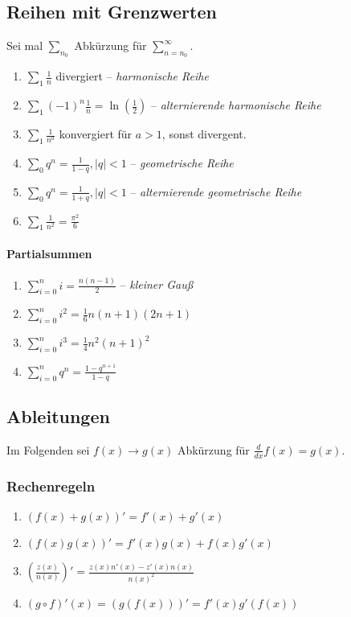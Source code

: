 \documentclass[a4paper, 9pt, DIV=24]{scrartcl}
\begin{document}
\subsection{Reihen mit Grenzwerten}
Sei mal $\sum_{n_0}$ Abkürzung für $\sum_{n=n_0}^\infty$.
\begin{enumerate}[label={(}\arabic*{)}]
 \item $\sum_1 \frac{1}{n}$ divergiert -- \emph{harmonische Reihe}
 \item $\sum_1 (-1)^n\frac{1}{n} = \ln(\frac{1}{2})$ -- \emph{alternierende harmonische Reihe}
 \item $\sum_1 \frac{1}{n^a}$ konvergiert für $a > 1$, sonst divergent.
 \item $\sum_0 q^n = \frac{1}{1-q}, |q| < 1$ -- \emph{geometrische Reihe}
 \item $\sum_0 q^n = \frac{1}{1+q}, |q| < 1$ -- \emph{alternierende geometrische Reihe}
 \item $\sum_1 \frac{1}{n^2} = \frac{\pi^2}{6}$
\end{enumerate}
\paragraph{Partialsummen}
\begin{enumerate}[label={(}\arabic*{)}]
 \item $\sum_{i=0}^n i = \frac{n(n-1)}{2}$ -- \emph{kleiner Gauß}
 \item $\sum_{i=0}^n i^2 = \frac{1}{6}n(n+1)(2n+1)$
 \item $\sum_{i=0}^n i^3 = \frac{1}{4}n^2(n+1)^2$
 \item $\sum_{i=0}^n q^n = \frac{1-q^{n+1}}{1-q}$
\end{enumerate}

\clearpage

\subsection{Ableitungen}
Im Folgenden sei $f(x) \rightarrow g(x)$ Abkürzung für $\frac{d}{dx} f(x) = g(x)$.
\subsubsection{Rechenregeln}
\begin{enumerate}[label={(}\arabic*{)}]
 \item $(f(x)+g(x))' = f'(x) + g'(x)$
 \item $(f(x)g(x))' = f'(x)g(x) + f(x)g'(x)$
 \item $(\frac{z(x)}{n(x)})' = \frac{z(x)n'(x) - z'(x)n(x)}{n(x)^2}$
 \item $(g \circ f)'(x) = (g(f(x)))' = f'(x)g'(f(x))$
\end{enumerate}
\end{document}
